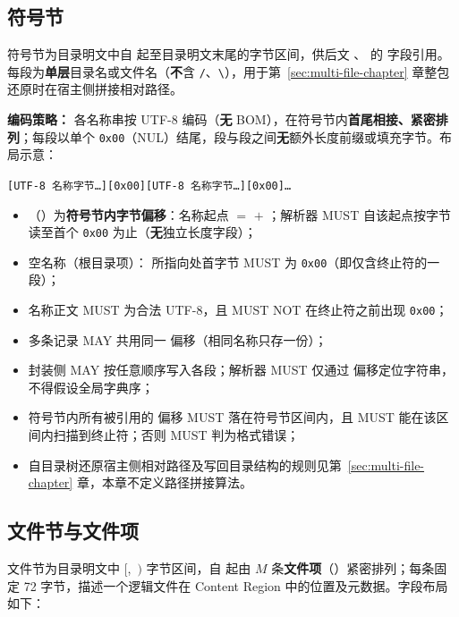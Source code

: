 \subsection{符号节}\label{sec:tree-string-section}

符号节为目录明文中自  起至目录明文末尾的字节区间，供后文 、 的  字段引用。每段为\textbf{单层}目录名或文件名（\textbf{不}含 \texttt{/}、\texttt{\textbackslash}），用于第~\ref{sec:multi-file-chapter} 章整包还原时在宿主侧拼接相对路径。

\textbf{编码策略：} 各名称串按 UTF-8 编码（\textbf{无} BOM），在符号节内\textbf{首尾相接、紧密排列}；每段以单个 \texttt{0x00}（NUL）结尾，段与段之间\textbf{无}额外长度前缀或填充字节。布局示意：
\begin{center}
  \small
  \texttt{[UTF-8 名称字节…][0x00][UTF-8 名称字节…][0x00]…}
\end{center}

\begin{itemize}
  \item {}（）为\textbf{符号节内字节偏移}：名称起点 $=$  $+$ ；解析器 MUST 自该起点按字节读至首个 \texttt{0x00} 为止（\textbf{无}独立长度字段）；
  \item 空名称（根目录项）： 所指向处首字节 MUST 为 \texttt{0x00}（即仅含终止符的一段）；
  \item 名称正文 MUST 为合法 UTF-8，且 MUST NOT 在终止符之前出现 \texttt{0x00}；
  \item 多条记录 MAY 共用同一  偏移（相同名称只存一份）；
  \item 封装侧 MAY 按任意顺序写入各段；解析器 MUST 仅通过  偏移定位字符串，不得假设全局字典序；
  \item 符号节内所有被引用的  偏移 MUST 落在符号节区间内，且 MUST 能在该区间内扫描到终止符；否则 MUST 判为格式错误；
  \item 自目录树还原宿主侧相对路径及写回目录结构的规则见第~\ref{sec:multi-file-chapter} 章，本章不定义路径拼接算法。
\end{itemize}

\subsection{文件节与文件项}\label{sec:tree-file-section}
\label{sec:tree-file-entry}

文件节为目录明文中 $[$,\ $)$ 字节区间，自  起由 $M$ 条\textbf{文件项}（）紧密排列；每条固定 72 字节，描述一个逻辑文件在 Content Region 中的位置及元数据。字段布局如下：

